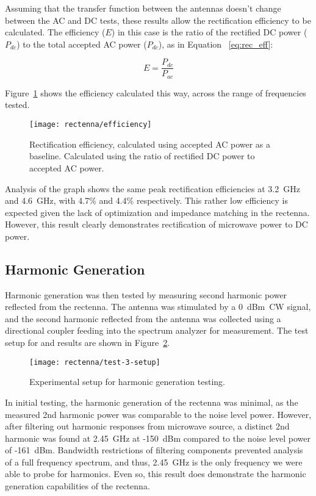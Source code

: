 Assuming that the transfer function between the antennas doesn't change between the AC and DC tests, these results allow the rectification efficiency to be calculated. The efficiency ($E$) in this case is the ratio of the rectified DC power ($P_{dc}$) to the total accepted AC power ($P_{dc}$), as in Equation ~\ref{eq:rec_eff}:

\begin{equation}
E = \frac{P_{dc}}{P_{ac}}
\label{eq:rec_eff}
\end{equation}

Figure~\ref{fig:rectenna-efficiency} shows the efficiency calculated this way, across the range of frequencies tested.

\begin{figure}[h!]
\centering
\texttt{[image: rectenna/efficiency]}
    \caption[Rectification efficiency]{Rectification efficiency, calculated using accepted AC power as a baseline. Calculated using the ratio of rectified DC power to accepted AC power.}
    \label{fig:rectenna-efficiency}
\end{figure}

Analysis of the graph shows the same peak rectification efficiencies at 3.2~GHz and 4.6~GHz, with 4.7\% and 4.4\% respectively. This rather low efficiency is expected given the lack of optimization and impedance matching in the rectenna. However, this result clearly demonstrates rectification of microwave power to DC power.

\subsection{Harmonic Generation}

Harmonic generation was then tested by measuring second harmonic power reflected from the rectenna. The antenna was stimulated by a 0~dBm~CW signal, and the second harmonic reflected from the antenna was collected using a directional coupler feeding into the spectrum analyzer for measurement. The test setup for and results are shown in Figure~\ref{fig:rectenna-test-3-setup}.

\begin{figure}[h!]
\centering
\texttt{[image: rectenna/test-3-setup]}
\caption{Experimental setup for harmonic generation testing.}
\label{fig:rectenna-test-3-setup}
\end{figure}

In initial testing, the harmonic generation of the rectenna was minimal, as the measured 2nd harmonic power was comparable to the noise level power. However, after filtering out harmonic responses from microwave source, a distinct 2nd harmonic was found at 2.45~GHz at -150~dBm compared to the noise level power of -161~dBm. Bandwidth restrictions of filtering components prevented analysis of a full frequency spectrum, and thus, 2.45~GHz is the only frequency we were able to probe for harmonics. Even so, this result does demonstrate the harmonic generation capabilities of the rectenna.

